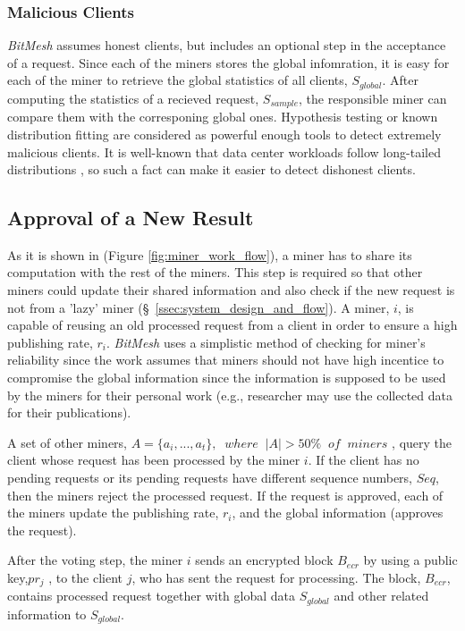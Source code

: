 \documentclass[11px]{article}
\newcommand{\projTitle}{BitMesh\xspace}
\begin{document}
\subsubsection{Malicious Clients}
\label{sssec:malicious_client}
\textit{\projTitle} assumes honest clients, but includes an optional step in the acceptance of a request. Since each of the miners stores the global infomration, it is easy for each of the miner to retrieve the global statistics of all clients, $S_{global}$. After computing the statistics of a recieved request, $S_{sample}$, the responsible miner can compare them with the corresponing global ones. Hypothesis testing or known distribution fitting \cite{walpole_statistics} are considered as powerful enough tools to detect extremely malicious clients. It is well-known that data center workloads follow long-tailed distributions \cite{diurnal_pattern_data_center_2, dctcp_ref, pFabric_ref}, so such a fact can make it easier to detect dishonest clients.

\subsection{Approval of a New Result}
As it is shown in (Figure \ref{fig:miner_work_flow}), a miner has to share its computation with the rest of the miners.  This step is required so that other miners could update their shared information and also check if the new request is not from a 'lazy' miner (\S\ \ref{ssec:system_design_and_flow}). A miner, $i$, is capable of  reusing an old processed request from a client in order to ensure a high publishing rate, $r_i$. \textit{\projTitle} uses a simplistic method of checking for miner's reliability since the work assumes that miners should not have high incentice to compromise the global information since the information is supposed to be used by the miners for their personal work (e.g., researcher may use the collected data for their publications).

\noindent \newline A set of other miners, $A= \{a_i, ..., a_t\}, \; \; where \; \; |A| > 50\% \; \; of \; \; miners$ , query the client whose request has been processed by the miner $i$. If the client has no pending requests or its pending requests have different sequence numbers, $Seq$, then the miners reject the processed request. If the request is approved, each of the miners update the publishing rate, $r_i$, and the global information (approves the request).

\noindent \newline After the voting step, the miner $i$ sends an encrypted block $B_{ecr}$ by using a public key,$pr_j$ , to the client $j$, who has sent the request for processing. The block, $B_{ecr}$, contains processed request together with global data $S_{global}$  and other related information to $S_{global}$.
\end{document}
